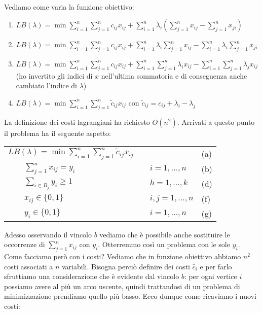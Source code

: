 \documentclass[11pt]{book}
\begin{document}
\

Vediamo come varia la funzione obiettivo:

\begin{enumerate}
\item $LB(\lambda) = \min \sum\limits_{i=1}^n\sum\limits_{j=1}^n c_{ij}x_{ij}
+ \sum\limits_{i=1}^n\lambda_i(\sum\limits_{j=1}^nx_{ij} -
\sum\limits_{j=1}^n x_{ji})$

\item $LB(\lambda) = \min \sum\limits_{i=1}^n\sum\limits_{j=1}^n
  c_{ij}x_{ij} + \sum\limits_{i=1}^n\lambda_i\sum\limits_{j=1}^nx_{ij}
  - \sum\limits_{i=1}^n\lambda_i\sum\limits_{j=1}^n x_{ji}$

\item $LB(\lambda) = \min \sum\limits_{i=1}^n\sum\limits_{j=1}^n
  c_{ij}x_{ij} + \sum\limits_{i=1}^n\sum\limits_{j=1}^n\lambda_ix_{ij}
  - \sum\limits_{i=1}^n\sum\limits_{j=1}^n\lambda_j x_{ij}$ (ho
  invertito gli indici di $x$ nell'ultima sommatoria e di conseguenza
  anche cambiato l'indice di $\lambda$)

\item $LB(\lambda) = \min \sum\limits_{i=1}^n\sum\limits_{j=1}^n
  \tilde{c}_{ij} x_{ij}$ con $\tilde{c}_{ij} = c_{ij} + \lambda_i -
  \lambda_j$
\end{enumerate}

La definizione dei costi lagrangiani ha richiesto $O(n^2)$. Arrivati a
questo punto il problema ha il seguente aspetto:

\begin{center}
\begin{tabular}{lp{2cm}ll}
  $LB(\lambda) = \min \sum\limits_{i=1}^n\sum\limits_{j=1}^n \tilde{c}_{ij} x_{ij}$ & & & (a)\\
  $\qquad \sum\limits_{j=1}^n x_{ij} = y_i$ & & $i=1,\dots,n$ & (b)\\
  $\qquad \sum\limits_{i \in R_j} y_i \geq 1$ & & $h = 1,\dots,k$ &
  (d) \\
  $\qquad x_{ij} \in\{0,1\}$ & & $i,j = 1,\dots,n$ & (f) \\
  $\qquad y_{i} \in\{0,1\}$ & & $i = 1,\dots,n$ & (g) \\
\end{tabular}
\end{center}

Adesso osservando il vincolo $b$ vediamo che \`e possibile anche
sostituire le occorrenze di $\sum\limits_{j=1}^nx_{ij}$ con
$y_i$. Otterremmo cos\`i un problema con le sole $y_i$. Come facciamo
per\`o con i costi? Vediamo che in funzione obiettivo abbiamo $n^2$
costi associati a $n$ variabili. Bisogna perci\`o definire dei costi
$\hat{c}_i$ e per farlo sfruttiamo una considerazione che \`e evidente
dal vincolo $b$: per ogni vertice $i$ possiamo avere al pi\`u un arco
uscente, quindi trattandosi di un problema di minimizzazione prendiamo
quello pi\`u basso. Ecco dunque come ricaviamo i nuovi costi:
\end{document}
